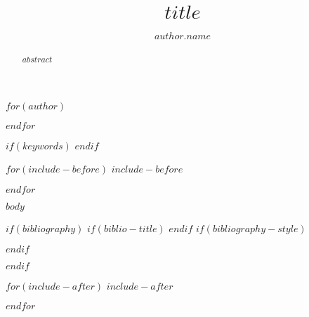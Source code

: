 \documentclass[$if(fontsize)$$fontsize$,$endif$$for(classoption)$$classoption$$sep$,$endfor$]{aastex61}
\begin{document}
\title{$title$}

$for(author)$
\author{$author.name$}
$endfor$

\begin{abstract}
$abstract$
\end{abstract}

$if(keywords)$
$endif$

$for(include-before)$
$include-before$

$endfor$

$body$

$if(bibliography)$
$if(biblio-title)$
\renewcommand\refname{$biblio-title$}
$endif$
$if(bibliography-style)$

$endif$

$endif$

$for(include-after)$
$include-after$

$endfor$
\end{document}
